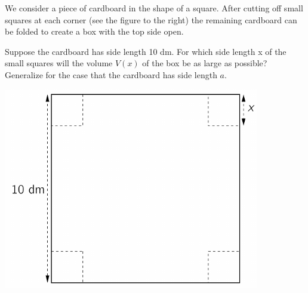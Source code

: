 \begin{minipage}{0.6\textwidth}
	\begin{exercise}
		We consider a piece of cardboard in the shape of a square.
		After cutting off small squares at each corner (see the figure
		to the right) the remaining cardboard can be folded to create
		a box with the top side open.
		\begin{tasks}
			\task Suppose the cardboard has side length 10 dm.
			For which side length x of the small squares will
			the volume $V(x)$ of the box be as large as possible?
			\task Generalize for the case that the cardboard has side
			length $a$.
		\end{tasks}
	\end{exercise}
\end{minipage}\hfill
\begin{minipage}{0.39\textwidth}
	\includegraphics[width=\textwidth]{images/box}
\end{minipage}\\
